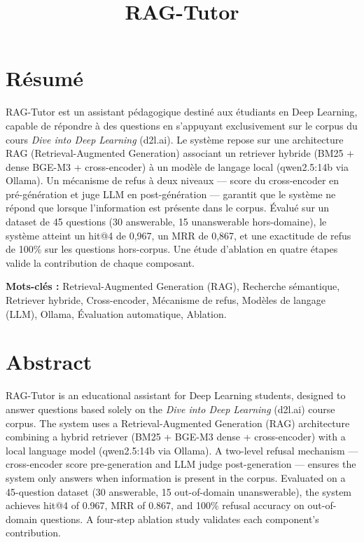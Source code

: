 \documentclass{rapportECL}
\title{RAG-Tutor}
\begin{document}

\fairemarges
\fairepagedegarde
\clearpage

\section*{Résumé}

RAG-Tutor est un assistant pédagogique destiné aux étudiants en Deep Learning, capable de répondre à des questions en s'appuyant exclusivement sur le corpus du cours \emph{Dive into Deep Learning} (d2l.ai). Le système repose sur une architecture RAG (Retrieval-Augmented Generation) associant un retriever hybride (BM25 + dense BGE-M3 + cross-encoder) à un modèle de langage local (qwen2.5:14b via Ollama). Un mécanisme de refus à deux niveaux — score du cross-encoder en pré-génération et juge LLM en post-génération — garantit que le système ne répond que lorsque l'information est présente dans le corpus. Évalué sur un dataset de 45 questions (30 answerable, 15 unanswerable hors-domaine), le système atteint un hit@4 de 0,967, un MRR de 0,867, et une exactitude de refus de 100\% sur les questions hors-corpus. Une étude d'ablation en quatre étapes valide la contribution de chaque composant.

\bigskip
\noindent\textbf{Mots-clés :}
Retrieval-Augmented Generation (RAG),
Recherche sémantique,
Retriever hybride,
Cross-encoder,
Mécanisme de refus,
Modèles de langage (LLM),
Ollama,
Évaluation automatique,
Ablation.

\section*{Abstract}

RAG-Tutor is an educational assistant for Deep Learning students, designed to answer questions based solely on the \emph{Dive into Deep Learning} (d2l.ai) course corpus. The system uses a Retrieval-Augmented Generation (RAG) architecture combining a hybrid retriever (BM25 + BGE-M3 dense + cross-encoder) with a local language model (qwen2.5:14b via Ollama). A two-level refusal mechanism — cross-encoder score pre-generation and LLM judge post-generation — ensures the system only answers when information is present in the corpus. Evaluated on a 45-question dataset (30 answerable, 15 out-of-domain unanswerable), the system achieves hit@4 of 0.967, MRR of 0.867, and 100\% refusal accuracy on out-of-domain questions. A four-step ablation study validates each component's contribution.
\end{document}
